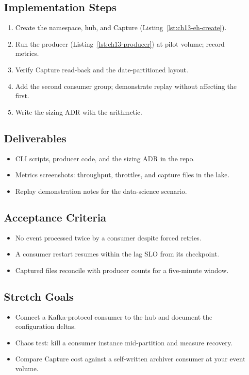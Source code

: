 \subsection*{Implementation Steps}
\begin{enumerate}
    \item Create the namespace, hub, and Capture (Listing~\ref{lst:ch13-eh-create}).
    \item Run the producer (Listing~\ref{lst:ch13-producer}) at pilot volume; record metrics.
    \item Verify Capture read-back and the date-partitioned layout.
    \item Add the second consumer group; demonstrate replay without affecting the first.
    \item Write the sizing ADR with the arithmetic.
\end{enumerate}

\subsection*{Deliverables}
\begin{itemize}
    \item CLI scripts, producer code, and the sizing ADR in the repo.
    \item Metrics screenshots: throughput, throttles, and capture files in the lake.
    \item Replay demonstration notes for the data-science scenario.
\end{itemize}

\subsection*{Acceptance Criteria}
\begin{itemize}
    \item No event processed twice by a consumer despite forced retries.
    \item A consumer restart resumes within the lag SLO from its checkpoint.
    \item Captured files reconcile with producer counts for a five-minute window.
\end{itemize}

\subsection*{Stretch Goals}
\begin{itemize}
    \item Connect a Kafka-protocol consumer to the hub and document the configuration deltas.
    \item Chaos test: kill a consumer instance mid-partition and measure recovery.
    \item Compare Capture cost against a self-written archiver consumer at your event volume.
\end{itemize}
